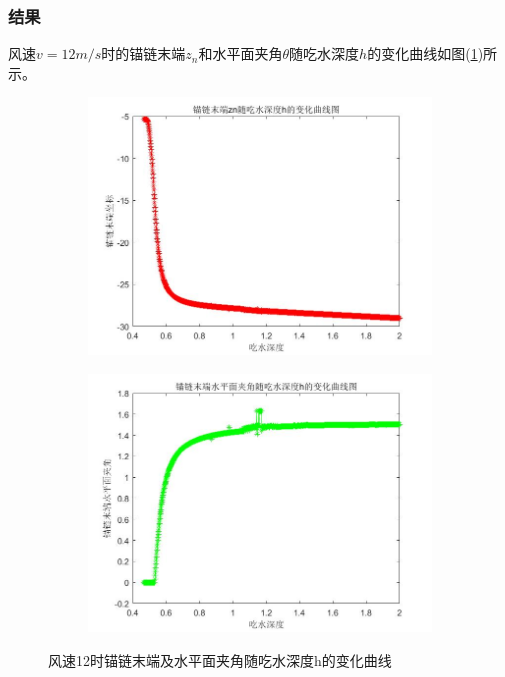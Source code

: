 \documentclass[UTF8]{ctexbook}
\theoremstyle{nonumberplain}
\begin{document}
        \subsubsection{结果}
            \par
            风速$v=12m/s$时的锚链末端$z_n$和水平面夹角$\theta$随吃水深度$h$的变化曲线如图(\ref{风速12时锚链末端及水平面夹角随吃水深度h的变化曲线})所示。
            \begin{figure}[H]
                \centering
                \begin{subfigure}[b]{0.4\textwidth}
                    \includegraphics[width=\textwidth]{images/3D_v_wind_12_zn_h.jpg}
                \end{subfigure}
                \begin{subfigure}[b]{0.4\textwidth}
                    \includegraphics[width=\textwidth]{images/3D_v_wind_12_theta_h.jpg}
                \end{subfigure}
                \caption{风速12时锚链末端及水平面夹角随吃水深度h的变化曲线}
                \label{风速12时锚链末端及水平面夹角随吃水深度h的变化曲线}
            \end{figure}
\end{document}
